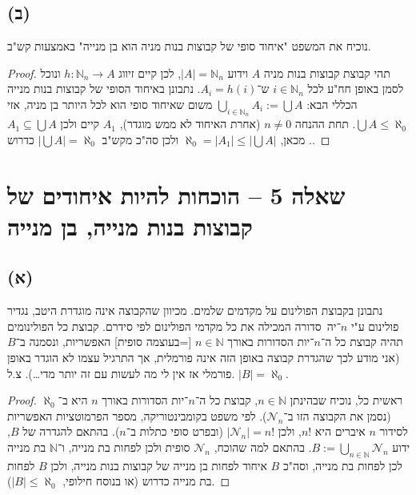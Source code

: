 \documentclass[]{article}
\newcommand\N     {\mathbb{N}}
\newcommand\nc    {\mathcal{N}}
\newcommand\az    {\aleph_0}
\newcommand\n     {$n$־יה\ }
\begin{document}
	\subsection*{(ב)}
	נוכיח את המשפט "איחוד סופי של קבוצות בנות מניה הוא בן מנייה" באמצעות קש"ב. 
	\begin{proof}
		תהי קבוצת קבוצות בנות מניה $ A $ וידוע $ |A| = \N_n $, לכן קיים זיווג $ h \colon \N_n \to A $ ונוכל לסמן באופן חח"ע לכל $ i \in \N_n $ ש־$ A_i = h(i) $. נתבונן באיחוד הסופי של קבוצות בנות מנייה הכללי הבא: 
		$ \bigcup_{i \in \N_n} A_i := \bigcup A$
		משום שאיחוד סופי הוא לכל היותר בן מניה, אזי $ \bigcup A \le \az $. תחת ההנחה $ n \neq 0 $ (אחרת האיחוד לא ממש מוגדר), $ A_1 $ קיים ולכן $ A_1 \subseteq \bigcup A $. מכאן, $ \az = |A_1| \le | \bigcup A| $ ולכן סה"כ מקש"ב $ |\bigcup A| = \az $ כדרוש. 
	\end{proof}
	
	\section*{שאלה 5 – הוכחות להיות איחודים של קבוצות בנות מנייה, בן מנייה}
	\subsection*{(א)}
	נתבונן בקבוצת הפולינום על מקדמים שלמים. מכיוון שהקבוצה אינה מוגדרת היטב, נגדיר פולינום ע"י \n סדורה המכילה את כל מקדמי הפולינום לפי סידרם. קבוצת כל הפולינומים תהיה קבוצת כל ה־$n$־יות הסדורות באורך $ n \in \N $ [=בעוצמה סופית] האפשריות, ונסמנה ב־$ B $ (אני מודע לכך שהגדרת קבוצה באופן הזה אינה פורמלית, אך התרגיל עצמו לא הוגדר באופן פורמלי אז אין לי מה לעשות עם זה יותר מדי\dots). צ.ל. $ |B| = \az $. 
	\begin{proof}
		ראשית כל, נוכיח שבהינתן $ n \in \N $, קבוצת כל ה־$ n $־יות הסדורות באורך $ n $ היא ב־$ \az $ (נסמן את הקבוצה הזו ב־$ \nc_n $). לפי משפט בקומבינטוריקה, מספר הפרמוטציות האפשריות לסידור $ n $ איברים היא $ n! $, ולכן $ |\nc_n| = n! $ (ובפרט סופי כתלות ב־$ n $). בהתאם להגדרה של $ B $, ידוע $ B := \bigcup_{n \in \N} \nc_n $. בהתאם למה שהוכח, $ \nc_n $ סופית ולכן לפחות בת מנייה, ו־$ \N $ בת מנייה לכן לפחות בת מנייה, וסה"כ $ B $ איחוד לפחות בן מנייה של קבוצות בנות מנייה, ולכן $ B $ לפחות בת מנייה כדרוש (או בנוסח חילופי, $ |B| \le \az $). 
	\end{proof}
\end{document}
